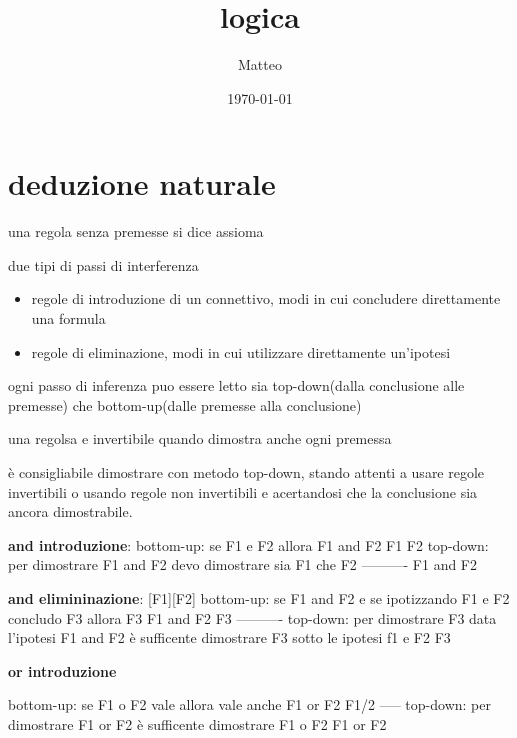 \documentclass[12pt]{article}
\title{logica}
\author{Matteo}
\date{\today}
\begin{document}
\maketitle

\section{deduzione naturale}

una regola senza premesse si dice assioma

due tipi di passi di interferenza
\begin{itemize}
\item regole di introduzione di un connettivo, modi in cui concludere direttamente una formula
\item regole di eliminazione, modi in cui utilizzare direttamente un'ipotesi
\end{itemize}

ogni passo di inferenza puo essere letto sia top-down(dalla conclusione alle premesse) che bottom-up(dalle premesse alla conclusione)

una regolsa e invertibile quando dimostra anche ogni premessa

è consigliabile dimostrare con metodo top-down, stando attenti a usare regole invertibili o usando regole non invertibili e acertandosi che la conclusione sia ancora dimostrabile.

\textbf{and introduzione}:
bottom-up: se F1 e F2 allora F1 and F2                                  F1  F2
top-down: per dimostrare F1 and F2 devo dimostrare sia  F1 che F2       ----------
                                                                         F1 and F2  

\textbf{and elimininazione}:
                                                                                                                           [F1][F2]
bottom-up: se F1 and F2 e se ipotizzando F1 e F2 concludo F3 allora F3                                        F1 and F2    F3
                                                                                                              ----------         
top-down: per dimostrare F3 data l'ipotesi F1 and F2 è sufficente dimostrare F3 sotto le ipotesi f1 e F2         F3

\textbf{or introduzione}

bottom-up: se F1 o F2 vale allora vale anche F1 or F2                 F1/2
                                                                      -----
top-down: per dimostrare F1 or F2 è sufficente dimostrare F1 o F2      F1 or F2
\end{document}
